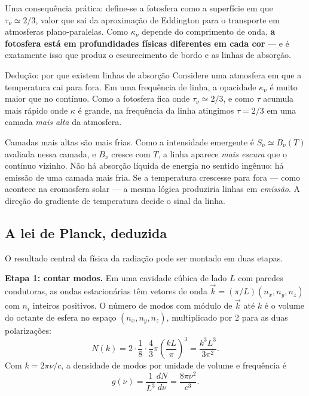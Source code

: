 \documentclass[11pt,a4paper]{article}
\begin{document}
Uma consequência prática: define-se a fotosfera como a superfície em que $\tau_\nu\simeq2/3$, valor que sai da aproximação de Eddington para o transporte em atmosferas plano-paralelas. Como $\kappa_\nu$ depende do comprimento de onda, \textbf{a fotosfera está em profundidades físicas diferentes em cada cor} --- e é exatamente isso que produz o escurecimento de bordo e as linhas de absorção.

\begin{lessonblock}[borderline west={2pt}{0pt}{astroGold}]{Dedução: por que existem linhas de absorção}
Considere uma atmosfera em que a temperatura cai para fora. Em uma frequência de linha, a opacidade $\kappa_\nu$ é muito maior que no contínuo. Como a fotosfera fica onde $\tau_\nu\simeq2/3$, e como $\tau$ acumula mais rápido onde $\kappa$ é grande, na frequência da linha atingimos $\tau=2/3$ em uma camada \emph{mais alta} da atmosfera.

Camadas mais altas são mais frias. Como a intensidade emergente é $S_\nu\simeq B_\nu(T)$ avaliada nessa camada, e $B_\nu$ cresce com $T$, a linha aparece \emph{mais escura} que o contínuo vizinho. Não há absorção líquida de energia no sentido ingênuo: há emissão de uma camada mais fria. Se a temperatura crescesse para fora --- como acontece na cromosfera solar --- a mesma lógica produziria linhas em \emph{emissão}. A direção do gradiente de temperatura decide o sinal da linha.
\end{lessonblock}

\subsection*{A lei de Planck, deduzida}

O resultado central da física da radiação pode ser montado em duas etapas.

\textbf{Etapa 1: contar modos.} Em uma cavidade cúbica de lado $L$ com paredes condutoras, as ondas estacionárias têm vetores de onda $\vec{k}=(\pi/L)(n_x,n_y,n_z)$ com $n_i$ inteiros positivos. O número de modos com módulo de $\vec{k}$ até $k$ é o volume do octante de esfera no espaço $(n_x,n_y,n_z)$, multiplicado por 2 para as duas polarizações:
\[
N(k)=2\cdot\frac{1}{8}\cdot\frac{4}{3}\pi\left(\frac{kL}{\pi}\right)^{3}=\frac{k^{3}L^{3}}{3\pi^{2}}.
\]
Com $k=2\pi\nu/c$, a densidade de modos por unidade de volume e frequência é
\[
g(\nu)=\frac{1}{L^{3}}\frac{dN}{d\nu}=\frac{8\pi\nu^{2}}{c^{3}}.
\]
\end{document}
